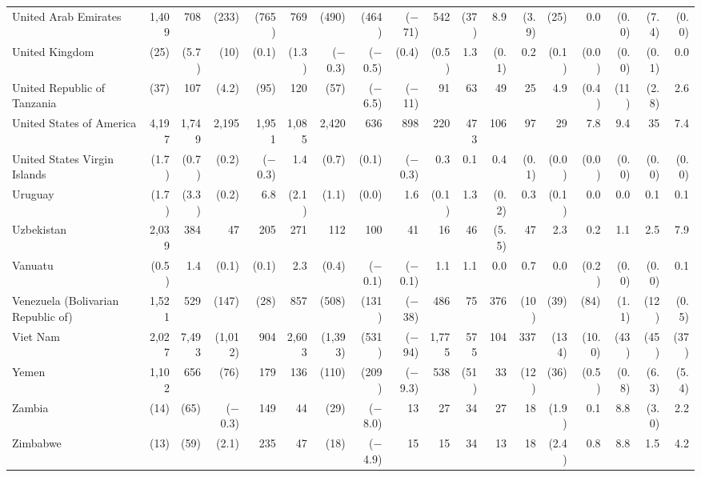 \begin{longtable}{lrrrrrrrrrrrrrrrrr}
United Arab Emirates & 1,409 & 708 & (233) & (765) & 769 & (490) & (464) & ($-$71) & 542 & (37) & 8.9 & (3.9) & (25) & 0.0 & (0.0) & (7.4) & (0.0) \\
United Kingdom & (25) & (5.7) & (10) & (0.1) & (1.3) & ($-$0.3) & ($-$0.5) & (0.4) & (0.5) & 1.3 & (0.1) & 0.2 & (0.1) & (0.0) & (0.0) & (0.1) & 0.0 \\
United Republic of Tanzania & (37) & 107 & (4.2) & (95) & 120 & (57) & ($-$6.5) & ($-$11) & 91 & 63 & 49 & 25 & 4.9 & (0.4) & (11) & (2.8) & 2.6 \\
United States of America & 4,197 & 1,749 & 2,195 & 1,951 & 1,085 & 2,420 & 636 & 898 & 220 & 473 & 106 & 97 & 29 & 7.8 & 9.4 & 35 & 7.4 \\
United States Virgin Islands & (1.7) & (0.7) & (0.2) & ($-$0.3) & 1.4 & (0.7) & (0.1) & ($-$0.3) & 0.3 & 0.1 & 0.4 & (0.1) & (0.0) & (0.0) & (0.0) & (0.0) & (0.0) \\
Uruguay & (1.7) & (3.3) & (0.2) & 6.8 & (2.1) & (1.1) & (0.0) & 1.6 & (0.1) & 1.3 & (0.2) & 0.3 & (0.1) & 0.0 & 0.0 & 0.1 & 0.1 \\
Uzbekistan & 2,039 & 384 & 47 & 205 & 271 & 112 & 100 & 41 & 16 & 46 & (5.5) & 47 & 2.3 & 0.2 & 1.1 & 2.5 & 7.9 \\
Vanuatu & (0.5) & 1.4 & (0.1) & (0.1) & 2.3 & (0.4) & ($-$0.1) & ($-$0.1) & 1.1 & 1.1 & 0.0 & 0.7 & 0.0 & (0.2) & (0.0) & (0.0) & 0.1 \\
Venezuela (Bolivarian Republic of) & 1,521 & 529 & (147) & (28) & 857 & (508) & (131) & ($-$38) & 486 & 75 & 376 & (10) & (39) & (84) & (1.1) & (12) & (0.5) \\
Viet Nam & 2,027 & 7,493 & (1,012) & 904 & 2,603 & (1,393) & (531) & ($-$94) & 1,775 & 575 & 104 & 337 & (134) & (10.0) & (43) & (45) & (37) \\
Yemen & 1,102 & 656 & (76) & 179 & 136 & (110) & (209) & ($-$9.3) & 538 & (51) & 33 & (12) & (36) & (0.5) & (0.8) & (6.3) & (5.4) \\
Zambia & (14) & (65) & ($-$0.3) & 149 & 44 & (29) & ($-$8.0) & 13 & 27 & 34 & 27 & 18 & (1.9) & 0.1 & 8.8 & (3.0) & 2.2 \\
Zimbabwe & (13) & (59) & (2.1) & 235 & 47 & (18) & ($-$4.9) & 15 & 15 & 34 & 13 & 18 & (2.4) & 0.8 & 8.8 & 1.5 & 4.2 \\
\end{longtable}

